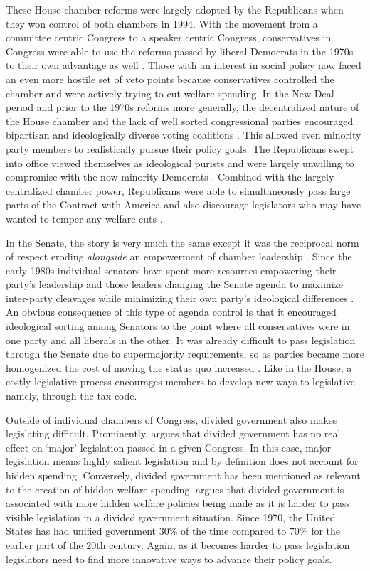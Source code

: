 \documentclass[12pt]{article}
\begin{document}
These House chamber reforms were largely adopted by the Republicans when they won control of both chambers in 1994. With the movement from a committee centric Congress to a speaker centric Congress, conservatives in Congress were able to use the reforms passed by liberal Democrats in the 1970s to their own advantage as well \citep{zelizer2007}. Those with an interest in social policy now faced an even more hostile set of veto points because conservatives controlled the chamber and were actively trying to cut welfare spending. In the New Deal period and prior to the 1970s reforms more generally, the decentralized nature of the House chamber and the lack of well sorted congressional parties encouraged bipartisan and ideologically diverse voting coalitions \citep{poole1997}. This allowed even minority party members to realistically pursue their policy goals. The Republicans swept into office viewed themselves as ideological purists and were largely unwilling to compromise with the now minority Democrats \citep{hacker2006}. Combined with the largely centralized chamber power, Republicans were able to simultaneously pass large parts of the Contract with America and also discourage legislators who may have wanted to temper any welfare cuts \citep{aldrich2000}. 

In the Senate, the story is very much the same except it was the reciprocal norm of respect eroding \emph{alongside} an empowerment of chamber leadership \citep{sinclair1986}. Since the early 1980s individual senators have spent more resources empowering their party's leadership and those leaders changing the Senate agenda to maximize inter-party cleavages while minimizing their own party's ideological differences \citep{lee2008}. An obvious consequence of this type of agenda control is that it encouraged ideological sorting among Senators to the point where all conservatives were in one party and all liberals in the other. It was already difficult to pass legislation through the Senate due to supermajority requirements, so as parties became more homogenized the cost of moving the status quo increased \citep{koger2010}. Like in the House, a costly legislative process encourages members to develop new ways to legislative -- namely, through the tax code.

Outside of individual chambers of Congress, divided government also makes legislating difficult. Prominently, \cite{mayhew1990} argues that divided government has no real effect on `major' legislation passed in a given Congress. In this case, major legislation means highly salient legislation and by definition does not account for hidden spending. Conversely, divided government has been mentioned as relevant to the creation of hidden welfare spending. \citet[Ch. 4]{howard2008} argues that divided government is associated with more hidden welfare policies being made as it is harder to pass visible legislation in a divided government situation. Since 1970, the United States has had unified government 30\% of the time compared to 70\% for the earlier part of the 20th century. Again, as it becomes harder to pass legislation legislators need to find more innovative ways to advance their policy goals.
\end{document}
